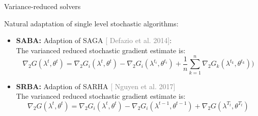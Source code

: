 \documentclass{beamer}
\newcommand{\citeline}[1]{\textcolor{gray}{\small[{\color{linkcolor} #1}]}}
\begin{document}
\begin{frame}{Variance-reduced solvers }

    Natural adaptation of single level stochastic algorithms:\\[1em]
    \begin{itemize}[<+->]
        \item[] \textbf{SABA:} Adaption of SAGA \citeline{Defazio et al. 2014}:\\[.5em]
        The varianced reduced stochastic gradient estimate is:
            $$
            \nabla_2G(\lambda^t, \theta^t) = \nabla_2 G_i(\lambda^t, \theta^t) - \nabla_2 G_i(\lambda^{t_i}, \theta^{t_i}) + \frac1n\sum_{k=1}^n \nabla_2 G_k(\lambda^{t_k}, \theta^{t_k}))
            $$
        \item[] \textbf{SRBA:} Adaption of SARHA \citeline{Nguyen et al. 2017}\\[.5em]
        The varianced reduced stochastic gradient estimate is:
            $$
            \nabla_2G(\lambda^t, \theta^t) = \nabla_2 G_i(\lambda^t, \theta^t) - \nabla_2 G_i(\lambda^{t-1}, \theta^{t-1}) + \nabla_2 G(\lambda^{T_t}, \theta^{T_t})
            $$
    \end{itemize}


\end{frame}



\end{document}
